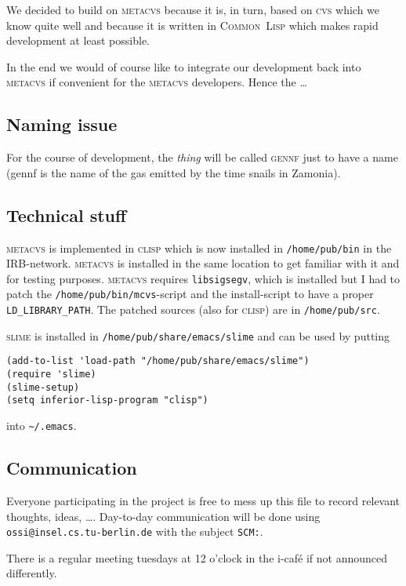 \documentclass[fleqn, german, 10pt, a4paper]{article}
\begin{document}
We decided to build on \textsc{metacvs} because it is, in turn, based on
\textsc{cvs} which we know quite well and because it is written in
\textsc{Common~Lisp} which makes rapid development at least possible.

In the end we would of course like to integrate our development back
into \textsc{metacvs} if convenient for the \textsc{metacvs} developers.
Hence the \ldots

\subsection{Naming issue}
For the course of development, the \emph{thing} will be called
\textsc{gennf} just to have a name (gennf is the name of the gas emitted
by the time snails in Zamonia).

\subsection{Technical stuff}
\textsc{metacvs} is implemented in \textsc{clisp} which is now installed
in \texttt{/home/pub/bin} in the IRB-network. \textsc{metacvs} is
installed in the same location to get familiar with it and for testing
purposes. \textsc{metacvs} requires \texttt{libsigsegv}, which is
installed but I had to patch the \texttt{/home/pub/bin/mcvs}-script and
the install-script to have a proper \texttt{LD\_LIBRARY\_PATH}. The
patched sources (also for \textsc{clisp}) are in \texttt{/home/pub/src}.

\textsc{slime} is installed in \texttt{/home/pub/share/emacs/slime} and
can be used by putting
\begin{verbatim}
(add-to-list 'load-path "/home/pub/share/emacs/slime")
(require 'slime)
(slime-setup)
(setq inferior-lisp-program "clisp")
\end{verbatim}

into \texttt{\textasciitilde/.emacs}.

\subsection{Communication}
Everyone participating in the project is free to mess up this file to
record relevant thoughts, ideas, \ldots.
Day-to-day communication will be done using
\texttt{ossi@insel.cs.tu-berlin.de} with the subject \texttt{SCM:}.

There is a regular meeting tuesdays at 12 o'clock in the i-caf\'e if
not announced differently.
\end{document}
